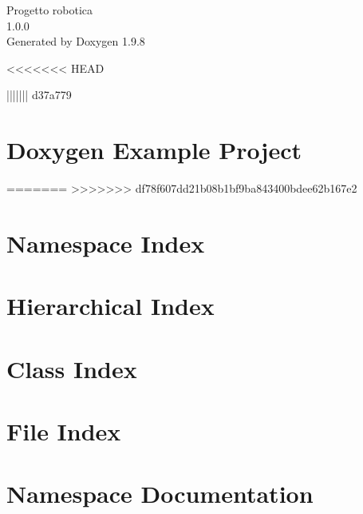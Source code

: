\documentclass[twoside]{book}
\newcommand{\+}{\discretionary{\mbox{\scriptsize$\hookleftarrow$}}{}{}}
\newcommand{\clearemptydoublepage}{%
    \newpage{\pagestyle{empty}\cleardoublepage}%
  }
\begin{document}
  \raggedbottom
    \hypersetup{pageanchor=false,
                bookmarksnumbered=true,
                pdfencoding=unicode
               }
  \begin{titlepage}
  \vspace*{7cm}
  \begin{center}%
  {\Large Progetto robotica}\\
  [1ex]\large 1.\+0.\+0 \\
  \vspace*{1cm}
  {\large Generated by Doxygen 1.9.8}\\
  \end{center}
  \end{titlepage}
  \clearemptydoublepage
  \tableofcontents
  \clearemptydoublepage
  \hypersetup{pageanchor=true}
<<<<<<< HEAD

||||||| d37a779
\chapter{Doxygen Example Project}
\label{index}\hypertarget{index}{}
=======
>>>>>>> df78f607dd21b08b1bf9ba843400bdee62b167e2
\chapter{Namespace Index}

\chapter{Hierarchical Index}

\chapter{Class Index}

\chapter{File Index}

\chapter{Namespace Documentation}


















\end{document}
